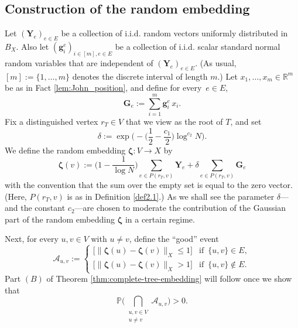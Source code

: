 \documentclass[11pt,leqno]{amsart}
\theoremstyle{remark}
\theoremstyle{plain}
\begin{document}
\subsection{Construction of the random embedding} \label{subsection_Constr_Rand_Emb}

Let $(\mathbf{Y}_e)_{e\in E}$ be a collection of i.i.d. random vectors uniformly distributed in $B_X$.
Also let $(\mathbf{g}_i^e)_{i\in [m], e\in E}$ be a collection of i.i.d. scalar standard normal random variables that are
independent of $(\mathbf{Y}_e)_{e\in E}$. (As usual, $[m]:=\{1,\dots,m\}$ denotes the discrete interval of length $m$.)
Let $x_1,\ldots,x_m\in \mathbb{R}^m$ be as in Fact \ref{lem:John_position}, and define for every~$e\in E$,
\begin{equation} \label{eq:G-def}
    \mathbf{G}_e := \sum_{i=1}^{m}\mathbf{g}_i^e\, x_i.
\end{equation}
Fix a distinguished vertex $r_T\in V$ that we view as the root of $T$, and set
\begin{equation} \label{eq:003}
\delta := \exp\Big( -\Big(\frac{1}{2}-\frac{c_1}{2}\Big) \log^{c_2}N \Big).
\end{equation}
We define the random embedding $\boldsymbol{\zeta}\colon V\to X$ by
\[ \boldsymbol{\zeta}(v) :=
\Big( 1-\frac{1}{\log N} \Big) \sum_{e\in P(r_T, v)} \mathbf{Y}_e +\delta \sum_{e\in P(r_T, v)} \mathbf{G}_e  \]
with the convention that the sum over the empty set is equal to the zero vector. (Here, $P(r_T,v)$ is as in Definition \ref{def2.1}.) As we shall see the parameter $\delta$---and the constant $c_2$---are chosen to moderate the contribution of the Gaussian part of the random embedding $\boldsymbol{\zeta}$ in a certain regime.

Next, for every $u,v\in V$ with $u\neq v$, define the ``good'' event
\[ \mathcal{A}_{u,v}:=
\begin{cases}
\big[ \|\boldsymbol{\zeta}(u)-\boldsymbol{\zeta}(v) \|_X \leqslant 1 \big] & \text{if } \, \{u,v\}\in E, \\
\big[ \| \boldsymbol{\zeta}(u)-\boldsymbol{\zeta}(v) \|_X > 1 \big] & \text{if } \, \{u,v\}\not\in E.
\end{cases} \]
Part $(B)$ of Theorem \ref{thm:complete-tree-embedding} will follow once we show that
\begin{equation} \label{eq:008}
\mathbb{P}\Bigg( \bigcap_{\substack{u,v\in V \\ u\neq v}} \mathcal{A}_{u,v} \Bigg)>0.
\end{equation}
\end{document}
